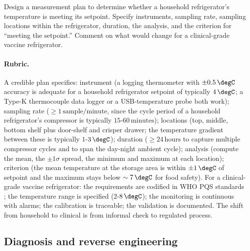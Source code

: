 \begin{exercise}
Design a measurement plan to determine whether a household
refrigerator's temperature is meeting its setpoint. Specify
instruments, sampling rate, sampling locations within the
refrigerator, duration, the analysis, and the criterion for
``meeting the setpoint.'' Comment on what would change for a
clinical-grade vaccine refrigerator.

\paragraph{Rubric.} A credible plan specifies: instrument (a logging
thermometer with $\pm 0.5 \,\degC$ accuracy is adequate for a
household refrigerator setpoint of typically $4 \,\degC$; a Type-K
thermocouple data logger or a USB-temperature probe both work);
sampling rate ($\geq 1 \,\text{sample/minute}$, since the cycle
period of a household refrigerator's compressor is typically
$15$-$60 \,\text{minutes}$); locations (top, middle, bottom shelf
plus door-shelf and crisper drawer; the temperature gradient
between these is typically $1$-$3 \,\degC$); duration ($\geq 24
\,\text{hours}$ to capture multiple compressor cycles and to span
the day-night ambient cycle); analysis (compute the mean, the
$\pm 1\sigma$ spread, the minimum and maximum at each location);
criterion (the mean temperature at the storage area is within
$\pm 1 \,\degC$ of setpoint and the maximum stays below $\sim 7
\,\degC$ for food safety). For a clinical-grade vaccine
refrigerator: the requirements are codified in WHO PQS standards
\cite{web:who-pqs-refrigerators-2024}; the temperature range is
specified ($2$-$8 \,\degC$); the monitoring is continuous with
alarms; the calibration is traceable; the validation is documented.
The shift from household to clinical is from informal check to
regulated process.
\end{exercise}

\subsection*{Diagnosis and reverse engineering}

